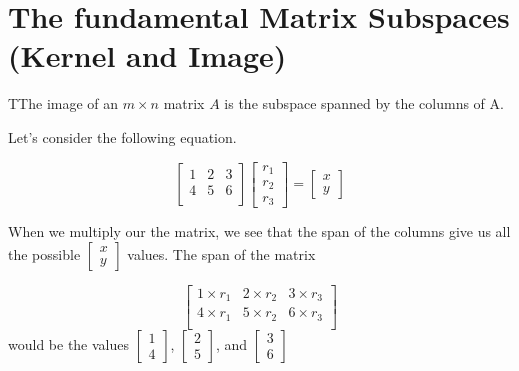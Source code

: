 \section{The fundamental Matrix Subspaces (Kernel and Image)}

  \begin{definition}
    TThe image of an $m\times n$ matrix $A$ is the subspace spanned by the columns of A.
  \end{definition}

  \begin{problem}

    Let's consider the following equation. 

    \begin{equation}
      \begin{bmatrix}
        1&2&3\\4&5&6\\
      \end{bmatrix}
      \begin{bmatrix}
        r_1\\r_2\\r_3
      \end{bmatrix}
      =
      \begin{bmatrix}
        x\\y
      \end{bmatrix}
    \end{equation}

    When we multiply our the matrix, we see that the span of the columns give us all the possible $\left[\begin{smallmatrix}x\\y\end{smallmatrix}\right]$ values. The span of the matrix 

    \begin{equation}
      \begin{bmatrix}
        1\times r_1&2\times r_2&3\times r_3\\
        4\times r_1&5\times r_2&6\times r_3\\
      \end{bmatrix}
    \end{equation}
    would be the values $\left[\begin{smallmatrix}1\\4\end{smallmatrix}\right]$, $\left[\begin{smallmatrix}2\\5\end{smallmatrix}\right]$, and $\left[\begin{smallmatrix}3\\6\end{smallmatrix}\right]$
  \end{problem}

